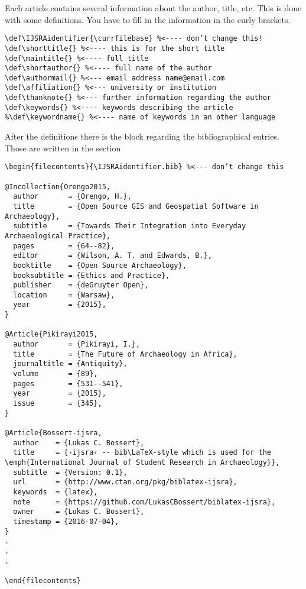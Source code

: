\documentclass[
french,
	]{ijsra}
\makeatletter
\def\IJSRAidentifier{\currfilebase}
\def\shorttitle{The \texttt{ijsra}-class, Version \IJSRAversion\ -- \IJSRAversiondate}
\def\maintitle{The \texttt{ijsra}-class, Version \IJSRAversion\ -- \IJSRAversiondate}
\def\shortauthor{Lukas C. Bossert}
\def\authormail{lukas@digitales-altertum.de}
\def\affiliation{Humboldt-Universität zu Berlin | Excellence-Cluster Topoi}
\def\thanknote{The coding of this documentclass is done at \href{https://github.com/LukasCBossert/documentclass-ijsra}{https://github.com/LukasCBossert/documentclass-ijsra} }
\def\keywords{documentclass, \LaTeX , IJSRA}
\makeatother
\begin{document}
\IJSRAseparator
Each article contains several information about the author, title, etc. 
This is done with some definitions. 
You have to fill in the information in the curly brackets.
\begin{lstlisting}[label=information,caption={Information about the article}]
\def\IJSRAidentifier{\currfilebase} %<---- don’t change this!
\def\shorttitle{} %<---- this is for the short title
\def\maintitle{} %<---- full title
\def\shortauthor{} %<---- full name of the author
\def\authormail{} %<--- email address name@email.com
\def\affiliation{} %<--- university or institution
\def\thanknote{} %<--- further information regarding the author
\def\keywords{} %<---- keywords describing the article
%\def\keywordname{} %<---- name of keywords in an other language
\end{lstlisting}
\IJSRAseparator
After the definitions there is the block regarding the bibliographical entries.
Those are written in the section 
\begin{lstlisting}[label=bibliography,caption={Bibliographical information}]
\begin{filecontents}{\IJSRAidentifier.bib} %<--- don’t change this

@Incollection{Orengo2015,
  author       = {Orengo, H.},
  title        = {Open Source GIS and Geospatial Software in Archaeology},
  subtitle     = {Towards Their Integration into Everyday Archaeological Practice},
  pages        = {64--82},
  editor       = {Wilson, A. T. and Edwards, B.},
  booktitle    = {Open Source Archaeology},
  booksubtitle = {Ethics and Practice},
  publisher    = {deGruyter Open},
  location     = {Warsaw},
  year         = {2015},
}

@Article{Pikirayi2015,
  author       = {Pikirayi, I.},
  title        = {The Future of Archaeology in Africa},
  journaltitle = {Antiquity},
  volume       = {89},
  pages        = {531--541},
  year         = {2015},
  issue        = {345},
}

@Article{Bossert-ijsra,
  author    = {Lukas C. Bossert},
  title     = {›ijsra‹ -- bib\LaTeX-style which is used for the \emph{International Journal of Student Research in Archaeology}},
  subtitle  = {Version: 0.1},
  url       = {http://www.ctan.org/pkg/biblatex-ijsra},
  keywords  = {latex},
  note      = {https://github.com/LukasCBossert/biblatex-ijsra},
  owner     = {Lukas C. Bossert},
  timestamp = {2016-07-04},
}
.
.
.

\end{filecontents}
\end{lstlisting}
\end{document}
